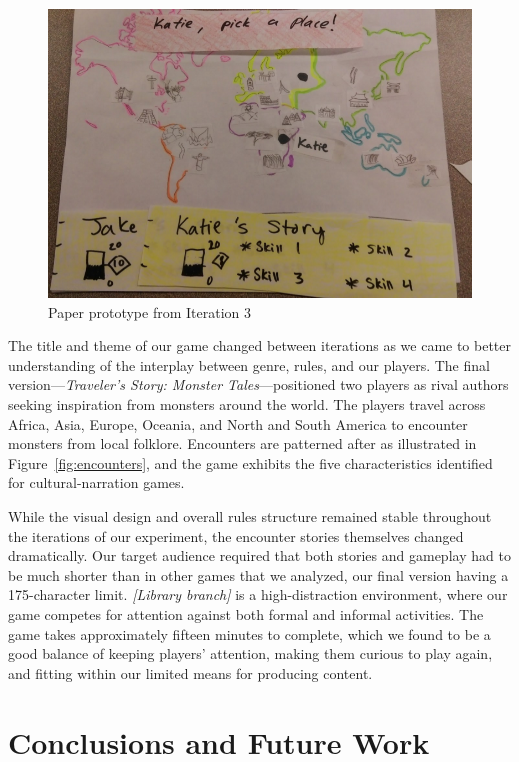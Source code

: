 \documentclass[a4paper]{article}
\begin{document}
\begin{figure}
\centering
\includegraphics[width=\figwidth]{paper-prototype}
\caption{Paper prototype from Iteration 3}
\label{fig:paper-prototype}
\end{figure}

The title and theme of our game changed between iterations as we came
to better understanding of the interplay between genre, rules, and our
players.  The final version---\textit{Traveler's Story: Monster
  Tales}---positioned two players as rival authors seeking inspiration
from monsters around the world. The players travel across Africa,
Asia, Europe, Oceania, and North and South America to encounter
monsters from local folklore.  Encounters are patterned after \totan{}
as illustrated in Figure~\ref{fig:encounters}, and the game exhibits
the five characteristics identified for cultural-narration games.

While the visual design and overall rules structure remained stable
throughout the iterations of our experiment, the encounter stories
themselves changed dramatically.
Our target audience required that both stories and gameplay 
had to be much shorter than in other games that we analyzed,
our final version having a 175-character limit.
\textit{[Library branch]} is a high-distraction environment,
where our game competes for attention against both formal and informal
activities. The game takes approximately fifteen minutes to complete,
which we found to be a good balance of keeping players' attention,
making them curious to play again,
and fitting within our limited means for producing content.


\section{Conclusions and Future Work}
\end{document}
